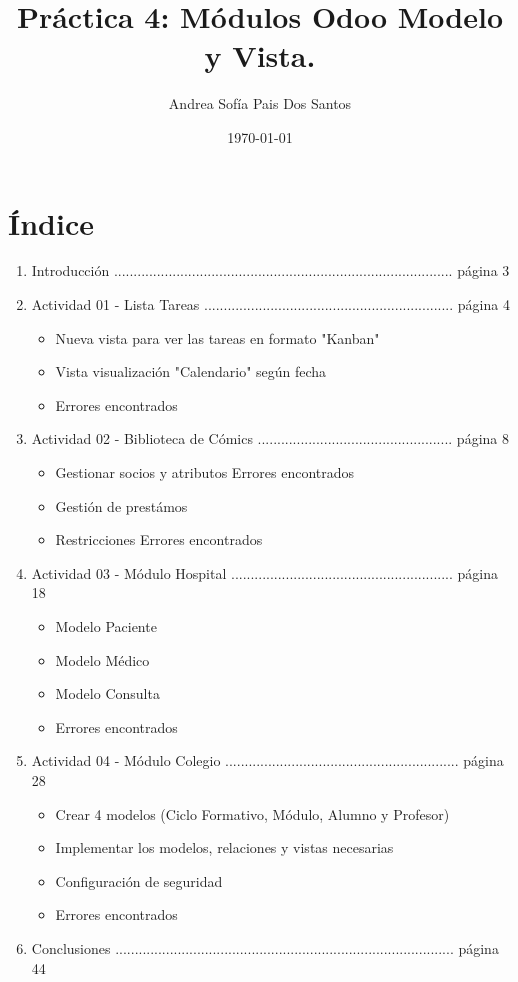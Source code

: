 \documentclass[a4paper,12pt]{article}
\title{Práctica 4: Módulos Odoo Modelo y Vista.}
\author{Andrea Sofía Pais Dos Santos}
\date{\today}
\begin{document}
\setlength{\droptitle}{0.4\textheight} 
\maketitle
\thispagestyle{empty}
\newpage 


\vspace{7cm}

\section{Índice}

\begin{enumerate}[start=2]
    \item Introducción  ....................................................................................... página 3
    \item Actividad 01 - Lista Tareas ................................................................ página 4
    \begin{itemize}
    \item Nueva vista para ver las tareas en formato "Kanban"
    \item Vista visualización "Calendario" según fecha
    \item Errores encontrados
    \end{itemize}
    \item Actividad 02 -  Biblioteca de Cómics .................................................. página 8
    \begin{itemize}
    \item Gestionar socios y atributos
    \subitem Errores encontrados
    \item Gestión de prestámos
    \item Restricciones
    \subitem Errores encontrados
    \end{itemize}
    \item Actividad 03 - Módulo Hospital ......................................................... página 18
    \begin{itemize}
    \item Modelo Paciente
    \item Modelo Médico
    \item Modelo Consulta
    \item Errores encontrados 
    \end{itemize}
    \item Actividad 04 -  Módulo Colegio ............................................................ página 28
    \begin{itemize}
    \item Crear 4 modelos (Ciclo Formativo, Módulo, Alumno y Profesor)
    \item Implementar los modelos, relaciones y vistas necesarias
    \item Configuración de seguridad
    \item Errores encontrados 
    \end{itemize}
    \item Conclusiones ....................................................................................... página 44
\end{enumerate}
\newpage
\end{document}
